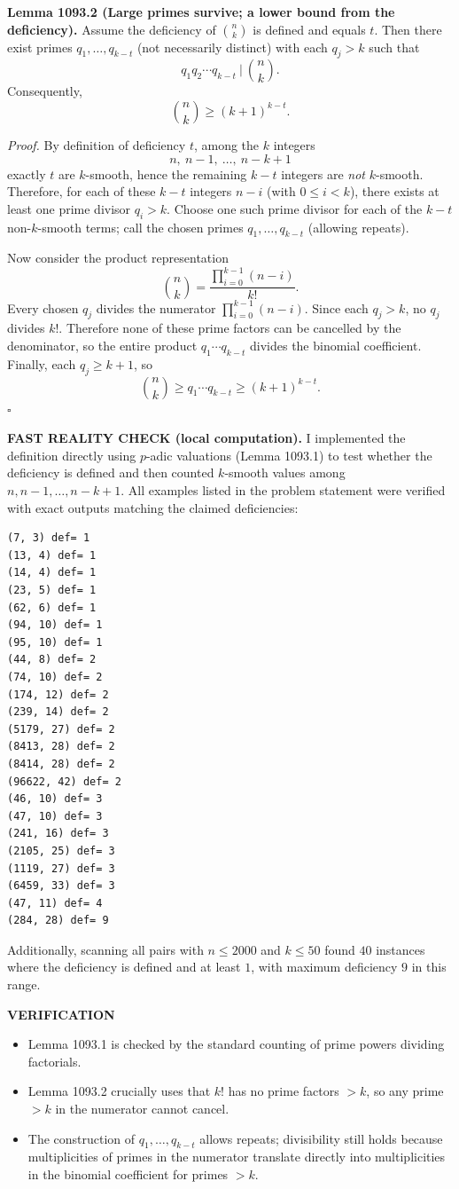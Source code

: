\textbf{Lemma 1093.2 (Large primes survive; a lower bound from the deficiency).}
Assume the deficiency of $\binom{n}{k}$ is defined and equals $t$.
Then there exist primes $q_1,\dots,q_{k-t}$ (not necessarily distinct) with each $q_j>k$ such that
\[q_1q_2\cdots q_{k-t} \ \Big|\ \binom{n}{k}.
\]
Consequently,
\[\binom{n}{k}\ge (k+1)^{k-t}.
\]

\emph{Proof.}
By definition of deficiency $t$, among the $k$ integers
\[n,\ n-1,\ \dots,\ n-k+1
\]
exactly $t$ are $k$-smooth, hence the remaining $k-t$ integers are \emph{not} $k$-smooth.
Therefore, for each of these $k-t$ integers $n-i$ (with $0\le i<k$), there exists at least one prime divisor $q_i>k$.
Choose one such prime divisor for each of the $k-t$ non-$k$-smooth terms; call the chosen primes $q_1,\dots,q_{k-t}$ (allowing repeats).

Now consider the product representation
\[\binom{n}{k}=\frac{\prod_{i=0}^{k-1}(n-i)}{k!}.
\]
Every chosen $q_j$ divides the numerator $\prod_{i=0}^{k-1}(n-i)$.
Since each $q_j>k$, no $q_j$ divides $k!$.
Therefore none of these prime factors can be cancelled by the denominator, so the entire product $q_1\cdots q_{k-t}$ divides the binomial coefficient.
Finally, each $q_j\ge k+1$, so
\[\binom{n}{k}\ge q_1\cdots q_{k-t}\ge (k+1)^{k-t}.
\]
\hfill$\square$

\textbf{FAST REALITY CHECK (local computation).}
I implemented the definition directly using $p$-adic valuations (Lemma 1093.1) to test whether the deficiency is defined and then counted $k$-smooth values among $n,n-1,\dots,n-k+1$.
All examples listed in the problem statement were verified with exact outputs matching the claimed deficiencies:
\begin{verbatim}
(7, 3) def= 1
(13, 4) def= 1
(14, 4) def= 1
(23, 5) def= 1
(62, 6) def= 1
(94, 10) def= 1
(95, 10) def= 1
(44, 8) def= 2
(74, 10) def= 2
(174, 12) def= 2
(239, 14) def= 2
(5179, 27) def= 2
(8413, 28) def= 2
(8414, 28) def= 2
(96622, 42) def= 2
(46, 10) def= 3
(47, 10) def= 3
(241, 16) def= 3
(2105, 25) def= 3
(1119, 27) def= 3
(6459, 33) def= 3
(47, 11) def= 4
(284, 28) def= 9
\end{verbatim}
Additionally, scanning all pairs with $n\le 2000$ and $k\le 50$ found $40$ instances where the deficiency is defined and at least $1$, with maximum deficiency $9$ in this range.

\textbf{VERIFICATION}

\begin{itemize}
\item Lemma 1093.1 is checked by the standard counting of prime powers dividing factorials.
\item Lemma 1093.2 crucially uses that $k!$ has no prime factors $>k$, so any prime $>k$ in the numerator cannot cancel.
\item The construction of $q_1,\dots,q_{k-t}$ allows repeats; divisibility still holds because multiplicities of primes in the numerator translate directly into multiplicities in the binomial coefficient for primes $>k$.
\end{itemize}

